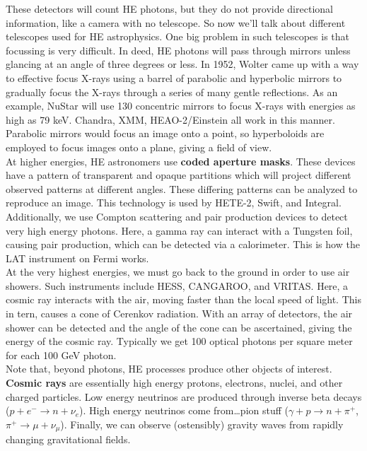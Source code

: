 \documentclass[10pt]{article}
\numberwithin{equation}{section}
\newcommand{\n}{\noindent}
\begin{document}
		\n These detectors will count HE photons, but they do not provide directional information, like a camera with no telescope. So now we'll talk about different telescopes used for HE astrophysics. One big problem in such telescopes is that focussing is very difficult. In deed, HE photons will pass through mirrors unless glancing at an angle of three degrees or less. In 1952, Wolter came up with a way to effective focus X-rays using a barrel of parabolic and hyperbolic mirrors to gradually focus the X-rays through a series of many gentle reflections. As an example, NuStar will use 130 concentric mirrors to focus X-rays with energies as high as 79 keV. Chandra, XMM, HEAO-2/Einstein all work in this manner. Parabolic mirrors would focus an image onto a point, so hyperboloids are employed to focus images onto a plane, giving a field of view.\\
		
		\n At higher energies, HE astronomers use \textbf{coded aperture masks}. These devices have a pattern of transparent and opaque partitions which will project different observed patterns at different angles. These differing patterns can be analyzed to reproduce an image. This technology is used by HETE-2, Swift, and Integral.\\
		
		\n Additionally, we use Compton scattering and pair production devices to detect very high energy photons. Here, a gamma ray can interact with a Tungsten foil, causing pair production, which can be detected via a calorimeter. This is how the LAT instrument on Fermi works.\\
		
		\n At the very highest energies, we must go back to the ground in order to use air showers. Such instruments include HESS, CANGAROO, and VRITAS. Here, a cosmic ray interacts with the air, moving faster than the local speed of light. This in tern, causes a cone of Cerenkov radiation. With an array of detectors, the air shower can be detected and the angle of the cone can be ascertained, giving the energy of the cosmic ray. Typically we get 100 optical photons per square meter for each 100 GeV photon. \\
		
		\n Note that, beyond photons, HE processes produce other objects of interest. \textbf{Cosmic rays} are essentially high energy protons, electrons, nuclei, and other charged particles. Low energy neutrinos are produced through inverse beta decays ($p+e^- \to n+ \nu_e$). High energy neutrinos come from\ldots pion stuff ($\gamma+p \to n+\pi^+$, $\pi^+ \to \mu + \nu_\mu$). Finally, we can observe (ostensibly) gravity waves from rapidly changing gravitational fields.
	
\end{document}
